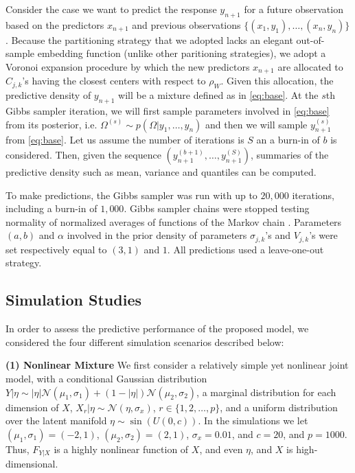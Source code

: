 \documentclass{article} %
\providecommand{\mc}[1]{\mathcal{#1}}
\begin{document}
Consider the case we want to predict the response $y_{n+1}$ for a future observation based on the predictors $x_{n+1}$ and previous observations $\{ (x_1,y_1), \ldots, (x_n,y_{n})\}$. Because the partitioning strategy that we adopted lacks an elegant out-of-sample embedding function (unlike other paritioning strategies), we adopt a Voronoi expansion procedure by which  the new predictors $x_{n+1}$ are allocated to $C_{j,k}$'s having the closest centers with respect to $\rho_W$. Given this allocation, the predictive density of $y_{n+1}$ will be a mixture defined as in \ref{eq:base}. At the $s$th  Gibbs sampler iteration, we will first sample parameters involved in \ref{eq:base} from its posterior, i.e. $\Omega^{(s)} \sim p\left(\Omega|y_1, \ldots, y_n\right)$ and then we will sample $y^{(s)}_{n+1}$ from \ref{eq:base}. Let us assume the number of iterations is $S$ an a burn-in of $b$ is considered. Then, given the sequence $\left(y^{(b+1)}_{n+1}, \ldots, y^{(S)}_{n+1}\right)$, summaries of the predictive density such as mean, variance and quantiles can be computed. 

To make predictions,
the Gibbs sampler was run with up to $20,000$ iterations, including a burn-in of $1,000$. Gibbs sampler chains were stopped testing normality of normalized averages of functions of the Markov chain \cite{Chauveau98anautomated}. Parameters $(a,b)$ and $\alpha$ involved in the prior density of parameters $\sigma_{j,k}$'s and $V_{j,k}$'s were set respectively equal to $(3,1)$ and $1$. All predictions used a leave-one-out strategy. %


\subsection{Simulation Studies}\label{sec:sim}

In order to assess the predictive performance of the proposed model, we considered the four different simulation scenarios described below: 

\textbf{(1) Nonlinear Mixture}
%
We first consider a relatively simple yet nonlinear joint model, with a conditional Gaussian distribution
	\mbox{$Y|\eta \sim  |\eta| \mc{N}(\mu_1,\sigma_1) + (1-|\eta|) \mc{N}(\mu_2,\sigma_2)$}, 
	a marginal distribution for each dimension of $X$, $X_r|\eta  \sim \mc{N}(\eta, \sigma_x)$, 
	$r \in \{1, 2, \ldots, p\}$, 
	and a uniform distribution over the latent manifold $\eta  \sim \sin(U(0,c))$. %
In the simulations we let $(\mu_1,\sigma_1)=(-2,1)$, $(\mu_2,\sigma_2)=(2,1)$, $\sigma_x=0.01$, and $c=20$, and $p=1000$. Thus, $F_{Y|X}$ is a highly nonlinear function of $X$, and even $\eta$, and $X$ is high-dimensional.  
\end{document}
